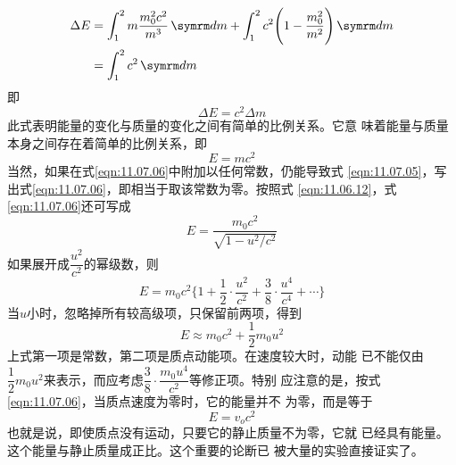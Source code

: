 ~\vspace{-1.2em}
\begin{equation*}
    \begin{aligned}
        \Delta E &=\int_{1}^{2} m \frac{m_{0}^{2} c^{2}}{m^{3}}  \dif m+\int_{1}^{2} c^{2}\Bigg(1-\frac{m_{0}^{2}}{m^{2}}\Bigg)  \dif m \\
        &=\int_{1}^{2} c^{2}  \dif m
    \end{aligned}
\end{equation*}
即\vspace{-1.2em}
\begin{equation}\label{eqn:11.07.05}
    \Delta E = c ^ { 2 } \Delta m
\end{equation}
此式表明能量的变化与质量的变化之间有简单的比例关系。它意
味着能量与质量本身之间存在着简单的比例关系，即
\begin{equation}\label{eqn:11.07.06}
    E = m c ^ { 2 }
\end{equation}
当然，如果在式\eqref{eqn:11.07.06}中附加以任何常数，仍能导致式
\eqref{eqn:11.07.05}，写出式\eqref{eqn:11.07.06}，即相当于取该常数为零。按照式
\eqref{eqn:11.06.12}，式\eqref{eqn:11.07.06}还可写成
\vspace{-1.2em}
\begin{equation}\label{eqn:11.07.07}
    E=\frac{m_{0} c^{2}}{\sqrt{1-u^{2} / c^{2}}}
\end{equation}
如果展开成$ \dfrac { u ^ 2 } { c ^ 2 } $的幂级数，则
\begin{equation}\label{eqn:11.07.08}
    E=m_{0} c^{2}\Big\{1+\frac{1}{2} \cdot \frac{u^{2}}{c^{2}}+\frac{3}{8} \cdot \frac{u^{4}}{c^{4}}+\cdots\Big\}
\end{equation}
当$ u $小时，忽略掉所有较高级项，只保留前两项，得到
\begin{equation}\label{eqn:11.07.09}
    E \approx m _ { 0 } c ^ { 2 } + \frac { 1 } { 2 } m _ { 0 } u ^ { 2 }
\end{equation}
上式第一项是常数，第二项是质点动能项。在速度较大时，动能
已不能仅由$  \dfrac { 1 } { 2 } m _ { 0 } u ^ 2   $来表示，而应考虑$ \dfrac{3}{8} \cdot \dfrac{m_0 u^{4}}{c^{2}} $等修正项。特别
应注意的是，按式\eqref{eqn:11.07.06}，当质点速度为零时，它的能量并不
为零，而是等于
\begin{equation}\label{eqn:11.07.10}
    E = v _ { o } c ^ { 2 }
\end{equation}
也就是说，即使质点没有运动，只要它的静止质量不为零，它就
已经具有能量。这个能量与静止质量成正比。这个重要的论断已
被大量的实验直接证实了。